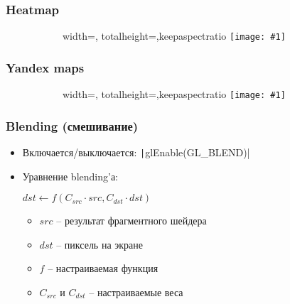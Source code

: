 \documentclass[10pt]{beamer}
\newcommand{\slideimage}[1]{
  \begin{figure}
    \begin{adjustbox}{width=\textwidth, totalheight=\textheight-2\baselineskip-2\baselineskip,keepaspectratio}
      \texttt{[image: \#1]}
    \end{adjustbox}
  \end{figure}
}
\begin{document}

\begin{frame}
\frametitle{Heatmap}
\begin{figure}
\slideimage{heatmap.jpg}
\end{figure}
\end{frame}


\begin{frame}
\frametitle{Yandex maps}
\begin{figure}
\slideimage{yandex-maps.png}
\end{figure}
\end{frame}


\begin{frame}[fragile]
\frametitle{Blending (смешивание)}
\begin{itemize}
\item Включается/выключается: \texttt|glEnable(GL_BLEND)|
\pause
\item Уравнение blending'а:
\begin{center}
\begin{math}
dst \leftarrow f(C_{src} \cdot src, C_{dst} \cdot dst)
\end{math}
\end{center}
\pause
\begin{itemize}
\item \begin{math}src\end{math} -- результат фрагментного шейдера
\pause
\item \begin{math}dst\end{math} -- пиксель на экране
\pause
\item \begin{math}f\end{math} -- настраиваемая функция
\pause
\item \begin{math}C_{src}\end{math} и \begin{math}C_{dst}\end{math} -- настраиваемые веса
\end{itemize}
\end{itemize}
\end{frame}
\end{document}
